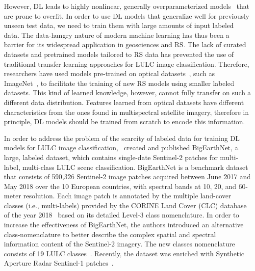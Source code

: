 \documentclass[journal]{IEEEtran}
\begin{document}
However, DL leads to highly nonlinear, generally overparameterized models~\citep{du2019gradient} that are prone to overfit. In order to use DL models that generalize well for previously unseen test data, we need to train them with large amounts of input labeled data. The data-hungry nature of modern machine learning has thus been a barrier for its widespread application in geosciences and RS. The lack of curated datasets and pretrained models tailored to RS data has prevented the use of traditional transfer learning approaches for LULC image classification. Therefore, researchers have used models pre-trained on optical datasets~\citep{sumbul2020bigearthnet}, such as ImageNet~\citep{deng2009imagenet}, to facilitate the training of new RS models using smaller labeled datasets. This kind of learned knowledge, however, cannot fully transfer on such a different data distribution. Features learned from optical datasets have different characteristics from the ones found in multispectral satellite imagery, therefore in principle, DL models should be trained from scratch to encode this information. 

In order to address the problem of the scarcity of labeled data for training DL models for LULC image classification,~\cite{8900532} created and published BigEarthNet, a large, labeled dataset, which contains single-date Sentinel-2 patches for multi-label, multi-class LULC scene classification. BigEarthNet is a benchmark dataset that consists of 590,326 Sentinel-2 image patches acquired between June 2017 and May 2018 over the 10 European countries, with spectral bands at 10, 20, and 60-meter resolution. Each image patch is annotated by the multiple land-cover classes (i.e., multi-labels) provided by the CORINE Land Cover (CLC) database of the year 2018~\citep{CLC2018} based on its detailed Level-3 class nomenclature. In order to increase the effectiveness of BigEarthNet, the authors introduced an alternative class-nomenclature to better describe the complex spatial and spectral information content of the Sentinel-2 imagery. The new classes nomenclature consists of 19 LULC classes~\citep{sumbul2020bigearthnet}. Recently, the dataset was enriched with Synthetic Aperture Radar Sentinel-1 patches~\citep{9552024}.
\end{document}
